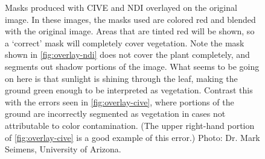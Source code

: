 \documentclass[letterpaper]{article}
\begin{document}
{{\begin{figure}[H]
	\centering
	\hfill
	\caption[Masks overlayed on original images]{Masks produced with CIVE and NDI overlayed on the original image. In these images, the masks used are colored red and blended with the original image. Areas that are tinted red will be shown, so a `correct' mask will completely cover vegetation. Note the mask shown in \ref{fig:overlay-ndi} does not cover the plant completely, and segments out shadow portions of the image. What seems to be going on here is that sunlight is shining through the leaf, making the ground green enough to be interpreted as vegetation. Contrast this with the errors seen in \ref{fig:overlay-cive}, where portions of the ground are incorrectly segmented as vegetation in cases not attributable to color contamination. (The upper right-hand portion of \ref{fig:overlay-cive} is a good example of this error.) Photo: Dr. Mark Seimens, University of Arizona.}
	\label{fig:overlay}
\end{figure}

}}
\end{document}
